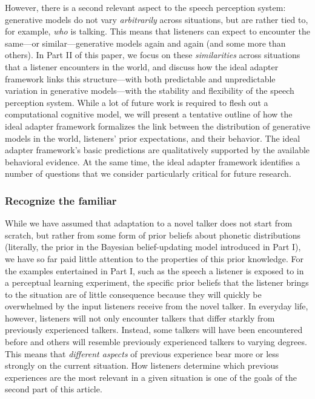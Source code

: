 However, there is a second relevant aspect to the speech perception system: generative models do not vary \emph{arbitrarily} across situations, but are rather tied to, for example, \emph{who} is talking.  This means that listeners can expect to encounter the same---or similar---generative models again and again (and some more than others).  In Part II of this paper, we focus on these \emph{similarities} across situations that a listener encounters in the world, and discuss how the ideal adapter framework links this structure---with both predictable and unpredictable variation in generative models---with the stability and flexibility of the speech perception system.  While a lot of future work is required to flesh out a computational cognitive model, we will present a tentative outline of how the ideal adapter framework formalizes the link between the distribution of generative models in the world, listeners' prior expectations, and their behavior.  The ideal adapter framework's basic predictions are qualitatively supported by the available behavioral evidence.  At the same time, the ideal adapter framework identifies a number of questions that we consider particularly critical for future research.

\subsubsection{Recognize the familiar}
\label{sec:recognize-familiar}

While we have assumed that adaptation to a novel talker does not start from scratch, but rather from some form of prior beliefs about phonetic distributions (literally, the prior in the Bayesian belief-updating model introduced in Part I), we have so far paid little attention to the properties of this prior knowledge.  For the examples entertained in Part I, such as the speech a listener is exposed to in a perceptual learning experiment, the specific prior beliefs that the listener brings to the situation are of little consequence because they will quickly be overwhelmed by the input listeners receive from the novel talker. In everyday life, however, listeners will not only encounter talkers that differ starkly from previously experienced talkers. Instead, some talkers will have been encountered before and others will resemble previously experienced talkers to varying degrees. This means that {\em different aspects} of previous experience bear more or less strongly on the current situation. How listeners determine which previous experiences are the most relevant in a given situation is one of the goals of the second part of this article. 

